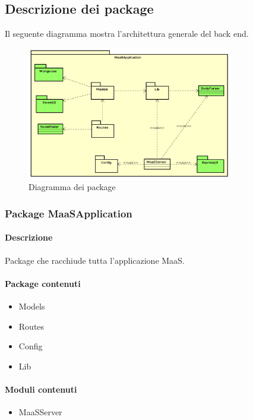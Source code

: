 \subsection{Descrizione dei package}
Il seguente diagramma mostra l'architettura generale del back end.
\begin{figure}[H]
\centering
\includegraphics[width=0.8\textwidth]{res/sections/backend/generale.png}
\caption{Diagramma dei package}
\end{figure}

\subsubsection{Package MaaSApplication}
\paragraph*{Descrizione}
Package che racchiude tutta l'applicazione MaaS.

\paragraph*{Package contenuti}
\begin{itemize}
\item Models
\item Routes
\item Config
\item Lib
\end{itemize}

\paragraph*{Moduli contenuti}
\begin{itemize}
\item MaaSServer
\end{itemize}

